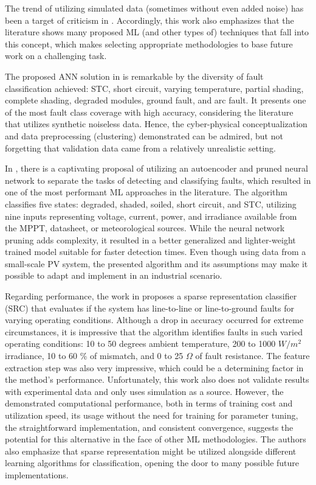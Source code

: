 The trend of utilizing simulated data (sometimes without even added noise) has been a target of criticism in \cite{Aziz2020}. Accordingly, this work also emphasizes that the literature shows many proposed ML (and other types of) techniques that fall into this concept, which makes selecting appropriate methodologies to base future work on a challenging task.

The proposed ANN solution in \cite{Rao2019} is remarkable by the diversity of fault classification achieved: STC, short circuit, varying temperature, partial shading, complete shading, degraded modules, ground fault, and arc fault. It presents one of the most fault class coverage with high accuracy, considering the literature that utilizes synthetic noiseless data. Hence, the cyber-physical conceptualization and data preprocessing (clustering) demonstrated can be admired, but not forgetting that validation data came from a relatively unrealistic setting. 

In \cite{Rao2021}, there is a captivating proposal of utilizing an autoencoder and pruned neural network to separate the tasks of detecting and classifying faults, which resulted in one of the most performant ML approaches in the literature. The algorithm classifies five states: degraded, shaded, soiled, short circuit, and STC, utilizing nine inputs representing voltage, current, power, and irradiance available from the MPPT, datasheet, or meteorological sources. While the neural network pruning adds complexity, it resulted in a better generalized and lighter-weight trained model suitable for faster detection times. Even though using data from a small-scale PV system, the presented algorithm and its assumptions may make it possible to adapt and implement in an industrial scenario.

Regarding performance, the work in \cite{Kilic2020} proposes a sparse representation classifier (SRC) that evaluates if the system has line-to-line or line-to-ground faults for varying operating conditions. Although a drop in accuracy occurred for extreme circumstances, it is impressive that the algorithm identifies faults in such varied operating conditions: 10 to 50 degrees ambient temperature, 200 to 1000 $W/m^2$ irradiance, 10 to 60 \% of mismatch, and 0 to 25 $\Omega$ of fault resistance. The feature extraction step was also very impressive, which could be a determining factor in the method's performance. Unfortunately, this work also does not validate results with experimental data and only uses simulation as a source. However, the demonstrated computational performance, both in terms of training cost and utilization speed, its usage without the need for training for parameter tuning, the straightforward implementation, and consistent convergence, suggests the potential for this alternative in the face of other ML methodologies. The authors also emphasize that sparse representation might be utilized alongside different learning algorithms for classification, opening the door to many possible future implementations.

